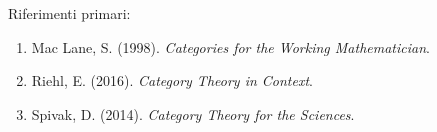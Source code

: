 Riferimenti primari:

\begin{enumerate}
\def\labelenumi{\arabic{enumi}.}
\tightlist
\item
  Mac Lane, S. (1998). \emph{Categories for the Working Mathematician}.
\item
  Riehl, E. (2016). \emph{Category Theory in Context}.
\item
  Spivak, D. (2014). \emph{Category Theory for the Sciences}.
\end{enumerate}
